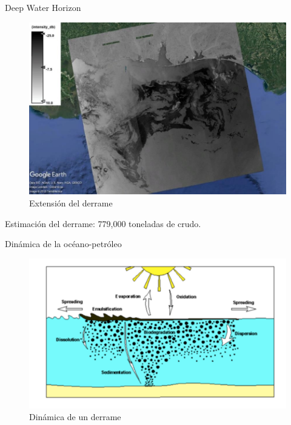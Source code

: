 \begin{frame}{Deep Water Horizon}
    \begin{figure}
        \centering
        \includegraphics[scale=0.3]{img/section_01/deep-water-horizon.jpg}
        \caption{Extensión del derrame}
        \label{fig:section_01_deep_water_horizon}
    \end{figure}

    Estimación del derrame: 779,000 toneladas de crudo.
\end{frame}

\begin{frame}{Dinámica de la océano-petróleo}
    \begin{figure}
        \centering
        \includegraphics[scale=0.2]{img/section_01/dinamica-derrame.png}
        \caption{Dinámica de un derrame}
        \label{fig:section_01_dinamica_derrame}
    \end{figure}    
\end{frame}
